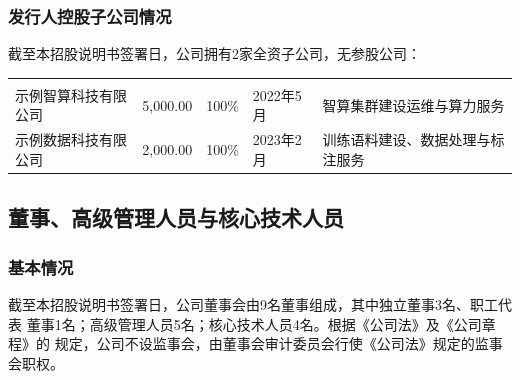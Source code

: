 \subsubsection{发行人控股子公司情况}

截至本招股说明书签署日，公司拥有2家全资子公司，无参股公司：

\begin{gstab}
\begin{longtable}{|L{34mm}|C{22mm}|C{20mm}|C{16mm}|L{34mm}|}
\hline
{} &  &  &  &  \\ \hline
\endfirsthead
\hline
{} &  &  &  &  \\ \hline
\endhead
示例智算科技有限公司 & 5,000.00 & 100\% & 2022年5月 & 智算集群建设运维与算力服务 \\ \hline
示例数据科技有限公司 & 2,000.00 & 100\% & 2023年2月 & 训练语料建设、数据处理与标注服务 \\ \hline
\end{longtable}
\end{gstab}

\subsection{董事、高级管理人员与核心技术人员}

\subsubsection{基本情况}

截至本招股说明书签署日，公司董事会由9名董事组成，其中独立董事3名、职工代表
董事1名；高级管理人员5名；核心技术人员4名。根据《公司法》及《公司章程》的
规定，公司不设监事会，由董事会审计委员会行使《公司法》规定的监事会职权。

